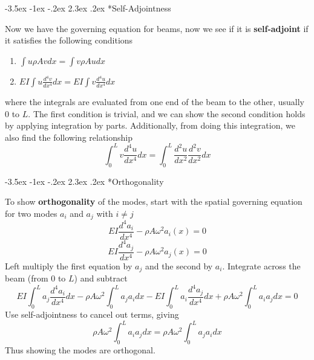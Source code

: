 \documentclass[letterpaper,twocolumn,notitlepage]{article}
\makeatletter
\renewcommand\subsection{\@startsection{section}{1}{\z@}%
 {-3.5ex \@plus-1ex \@minus-.2ex}%
 {2.3ex \@plus.2ex}%
 {\fontsize{8pt}{8pt}\selectfont\sffamily}}
\makeatother
\begin{document}
  \subsection*{Self-Adjointness}

  Now we have the governing equation for beams, now we see if it is \textbf{self-adjoint} if it satisfies the following conditions
  \begin{enumerate}[label=\roman*)] %
    \setlength{\itemsep}{0pt}
    \item{$\boxed{\int u\rho Avdx=\int v\rho Audx}$}
    \item{$\boxed{EI\int u\frac{d^{4}v}{dx^{4}}dx=EI\int v\frac{d^{4}u}{dx^{4}}dx}$}
  \end{enumerate}
  where the integrals are evaluated from one end of the beam to the other, usually $0$ to $L$.
  The first condition is trivial, and we can show the second condition holds by applying integration by parts.
  Additionally, from doing this integration, we also find the following relationship
  \begin{equation*}
    \boxed{\int_{0}^{L}v\frac{d^{4}u}{dx^{4}}dx=\int_{0}^{L}\frac{d^{2}u}{dx^{2}}\frac{d^{2}v}{dx^{2}}dx}
  \end{equation*}

  \subsection*{Orthogonality}

  To show \textbf{orthogonality} of the modes, start with the spatial governing equation for two modes $a_{i}$ and $a_{j}$ with $i\neq j$
  \begin{equation*}
    \boxed{EI\frac{d^{4}a_{i}}{dx^{4}}-\rho A\omega^{2}a_{i}(x)=0}
  \end{equation*}
  \begin{equation*}
    \boxed{EI\frac{d^{4}a_{j}}{dx^{4}}-\rho A\omega^{2}a_{j}(x)=0}
  \end{equation*}
  Left multiply the first equation by $a_{j}$ and the second by $a_{i}$.
  Integrate across the beam (from $0$ to $L$) and subtract
  \begin{equation*}
    EI\int_{0}^{L}a_{j}\frac{d^{4}a_{i}}{dx^{4}}dx-\rho A\omega^{2}\int_{0}^{L}a_{j}a_{i}dx-
    EI\int_{0}^{L}a_{i}\frac{d^{4}a_{j}}{dx^{4}}dx+\rho A\omega^{2}\int_{0}^{L}a_{i}a_{j}dx=0
  \end{equation*}
  Use self-adjointness to cancel out terms, giving
  \begin{equation*}
    \rho A\omega^{2}\int_{0}^{L}a_{i}a_{j}dx=\rho A\omega^{2}\int_{0}^{L}a_{j}a_{i}dx
  \end{equation*}
  Thus showing the modes are orthogonal.
\end{document}
